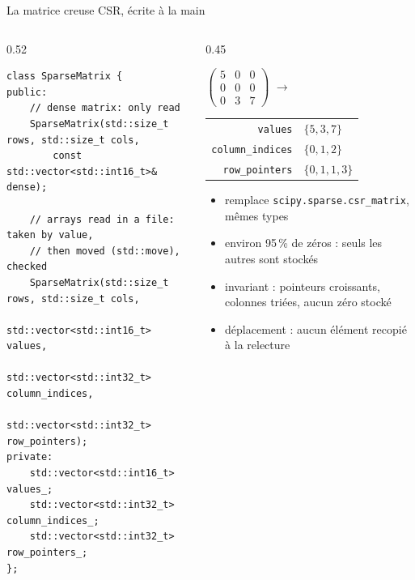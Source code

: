 \documentclass[aspectratio=169,10pt]{beamer}
\newcommand{\code}[1]{\texttt{#1}}
\begin{document}
\begin{frame}[fragile]{La matrice creuse CSR, écrite à la main}
  \begin{columns}[T]
    \begin{column}{0.52\textwidth}
\begin{lstlisting}
class SparseMatrix {
public:
    // dense matrix: only read
    SparseMatrix(std::size_t rows, std::size_t cols,
        const std::vector<std::int16_t>& dense);

    // arrays read in a file: taken by value,
    // then moved (std::move), checked
    SparseMatrix(std::size_t rows, std::size_t cols,
        std::vector<std::int16_t> values,
        std::vector<std::int32_t> column_indices,
        std::vector<std::int32_t> row_pointers);
private:
    std::vector<std::int16_t> values_;
    std::vector<std::int32_t> column_indices_;
    std::vector<std::int32_t> row_pointers_;
};
\end{lstlisting}
    \end{column}
    \begin{column}{0.45\textwidth}
      {\centering\scriptsize
        $\begin{pmatrix} 5 & 0 & 0\\ 0 & 0 & 0\\ 0 & 3 & 7 \end{pmatrix}$%
        \enspace$\rightarrow$\enspace
        {%
        \begin{tabular}{@{}r@{\;=\;}l@{}}
          \code{values} & $\{5, 3, 7\}$\\
          \code{column\_indices} & $\{0, 1, 2\}$\\
          \code{row\_pointers} & $\{0, 1, 1, 3\}$
        \end{tabular}}\par}
      \vspace{0.6em}
      \small
      \begin{itemize}
        \item remplace \code{scipy.sparse.csr\_matrix}, mêmes types
        \item environ 95\,\% de zéros : seuls les autres sont stockés
        \item invariant : pointeurs croissants, colonnes triées, aucun zéro stocké
        \item déplacement : aucun élément recopié à la relecture
      \end{itemize}
    \end{column}
  \end{columns}
\end{frame}
\end{document}
